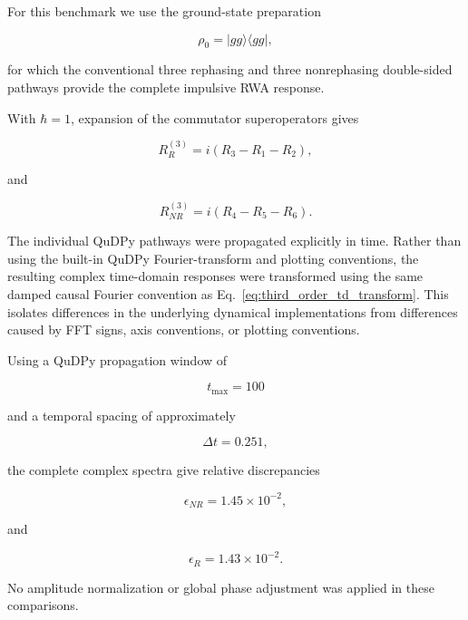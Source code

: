 \documentclass[11pt]{article}
\begin{document}
For this benchmark we use the ground-state preparation

\begin{equation}
\rho_0
=
|gg\rangle\langle gg|,
\end{equation}

for which the conventional three rephasing and three nonrephasing
double-sided pathways provide the complete impulsive RWA response.

With $\hbar=1$, expansion of the commutator superoperators gives

\begin{equation}
R_R^{(3)}
=
i
\left(
R_3-R_1-R_2
\right),
\label{eq:qudpy_rephasing_combination}
\end{equation}

and

\begin{equation}
R_{NR}^{(3)}
=
i
\left(
R_4-R_5-R_6
\right).
\label{eq:qudpy_nonrephasing_combination}
\end{equation}

The individual QuDPy pathways were propagated explicitly in time.
Rather than using the built-in QuDPy Fourier-transform and plotting
conventions, the resulting complex time-domain responses were
transformed using the same damped causal Fourier convention as
Eq.~\eqref{eq:third_order_td_transform}.  This isolates differences in
the underlying dynamical implementations from differences caused by
FFT signs, axis conventions, or plotting conventions.

Using a QuDPy propagation window of

\begin{equation}
t_{\max}=100
\end{equation}

and a temporal spacing of approximately

\begin{equation}
\Delta t=0.251,
\end{equation}

the complete complex spectra give relative discrepancies

\begin{equation}
\epsilon_{NR}
=
1.45\times10^{-2},
\end{equation}

and

\begin{equation}
\epsilon_R
=
1.43\times10^{-2}.
\end{equation}

No amplitude normalization or global phase adjustment was applied in
these comparisons.
\end{document}
